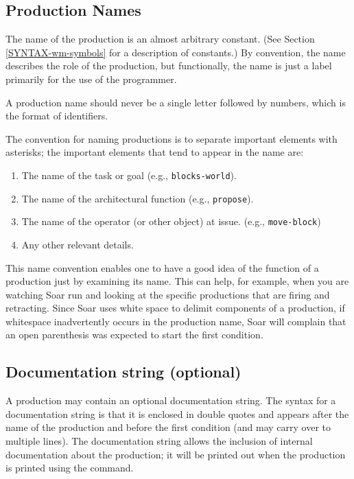 \subsection{Production Names}

The name of the production is  an almost arbitrary constant. (See Section
\ref{SYNTAX-wm-symbols} for a description of constants.) By convention, the
name describes the role of the production, but functionally, the name is
just a label primarily for the use of the programmer.  

A production name should never be a single letter followed by numbers, 
which is the format of identifiers.

The convention for naming productions is to separate important elements
with asterisks; the important elements that tend to appear in the name
are:\vspace{-12pt}
\begin{enumerate}
\item The name of the task or goal (e.g., \texttt{blocks-world}).\vspace{-10pt}
\item The name of the architectural function (e.g., \texttt{propose}).\vspace{-
10pt}
\item The name of the operator (or other object) at issue. (e.g.,
        \texttt{move-block})\vspace{-10pt} 
\item Any other relevant details.
\end{enumerate}


This name convention enables one to have a good idea of the function of
a production just by examining its name. This can help, for example,
when you are watching Soar run and looking at the specific productions
that are firing and retracting.  Since Soar uses white space to delimit
components of a production, if whitespace inadvertently occurs in the
production name, Soar will complain that an open parenthesis was
expected to start the first condition.

\subsection{Documentation string (optional)}

A production may contain an optional documentation string. The syntax
for a documentation string is that it is enclosed in double quotes and
appears after the name of the production and before the first condition
(and may carry over to multiple lines). The documentation string allows
the inclusion of internal documentation about the production; it will be
printed out when the production is printed using the 
command.

